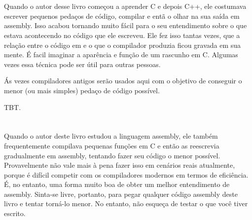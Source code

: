 \section{\PTBRph{}}

Quando o autor desse livro começou a aprender C e depois C++, ele costumava escrever pequenos pedaços de código, compilar e entã o olhar na sua saída em assembly.
Isso acabou tornando muito fácil para o seu entendimento sobre o que estava acontecendo no código que ele escreveu.
Ele fez isso tantas vezes, que a relação entre o código em \CCpp e o que o compilador produzia ficou gravada em sua mente.
É facil imaginar a aparência e função de um rascunho em C. Algumas vezes essa técnica pode ser útil para outras pessoas.

Ás vezes compiladores antigos serão usados aqui com o objetivo de conseguir o menor (ou mais simples) pedaço de código possível.

\iffalse
Quando o autor deste livro começou a aprender C e, mais tarde, \Cpp, ele costumava escrever pequenos pedaços de código, compilá-los, 
e então olhar a saída em linguagem assembly. Isso tornou muito fácil para ele entender o que estava acontecendo no código que ele tinha escrito.
\footnote{Na verdade, ele ainda faz isso quando não consegue entender o que faz um determinado pedaço de código.}. 
Ele fez isso tantas vezes que o relacionamento entre o código \CCpp code e o que o compilador produzia ficou registrado profundamente em sua mente. 
É fácil imaginar de imediato um esboço da aparência e função do código C. 
Talvez essa técnica poderia ser útil para mais alguém.


Em determinadas partes foram usados aqui compiladores muito antigos, para se obter o menor (ou mais simples) snippet possível.
\fi
\ac{TBT}.
\section*{\Exercises}

Quando o autor deste livro estudou a linguagem assembly, ele também frequentemente compilava pequenas funções em C e então as reescrevia gradualmente em assembly, tentando fazer seu código o menor possível.
Provavelmente não vale mais à pena fazer isso em cenários reais atualmente, 
porque é difícil competir com os compiladores modernos em termos de eficiência. É, no entanto, uma forma muito boa de obter um melhor entendimento de assembly.
Sinta-se livre, portanto, para pegar qualquer código assembly deste livro e tentar torná-lo menor.
No entanto, não esqueça de testar o que você tiver escrito.


